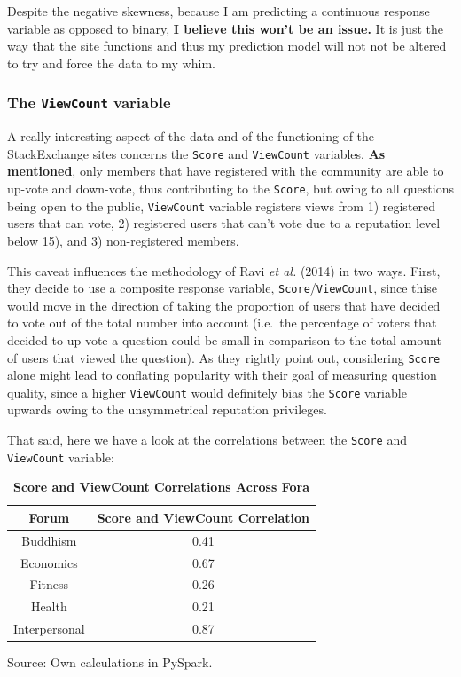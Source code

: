 \documentclass[11pt,preprint, authoryear]{article}
\numberwithin{equation}{section}
\begin{document}
\normalsize

Despite the negative skewness, because I am predicting a continuous
response variable as opposed to binary, \textbf{I believe this won't be
an issue.} It is just the way that the site functions and thus my
prediction model will not not be altered to try and force the data to my
whim.

\subsubsection{\texorpdfstring{The \texttt{ViewCount}
variable}{The ViewCount variable}}\label{the-viewcount-variable}

A really interesting aspect of the data and of the functioning of the
StackExchange sites concerns the \texttt{Score} and \texttt{ViewCount}
variables. \textbf{As mentioned}, only members that have registered with
the community are able to up-vote and down-vote, thus contributing to
the \texttt{Score}, but owing to all questions being open to the public,
\texttt{ViewCount} variable registers views from 1) registered users
that can vote, 2) registered users that can't vote due to a reputation
level below 15), and 3) non-registered members.

This caveat influences the methodology of Ravi \emph{et al.} (2014) in
two ways. First, they decide to use a composite response variable,
\texttt{Score}/\texttt{ViewCount}, since thise would move in the
direction of taking the proportion of users that have decided to vote
out of the total number into account (i.e.~the percentage of voters that
decided to up-vote a question could be small in comparison to the total
amount of users that viewed the question). As they rightly point out,
considering \texttt{Score} alone might lead to conflating popularity
with their goal of measuring question quality, since a higher
\texttt{ViewCount} would definitely bias the \texttt{Score} variable
upwards owing to the unsymmetrical reputation privileges.

That said, here we have a look at the correlations between the
\texttt{Score} and \texttt{ViewCount} variable:

\footnotesize

\begin{longtable} {@{} cc @{}}
\caption{\textbf{Score and ViewCount Correlations Across Fora}}
\label{tab:corr}\\ 
\toprule
\textbf{Forum} & \textbf{Score and ViewCount Correlation} \\ 
\midrule
Buddhism & 0.41 \\
Economics & 0.67 \\
Fitness & 0.26 \\
Health & 0.21 \\
Interpersonal & 0.87 \\
\bottomrule
\end{longtable}\begin{center} Source: Own calculations in PySpark.\end{center}
\end{document}
